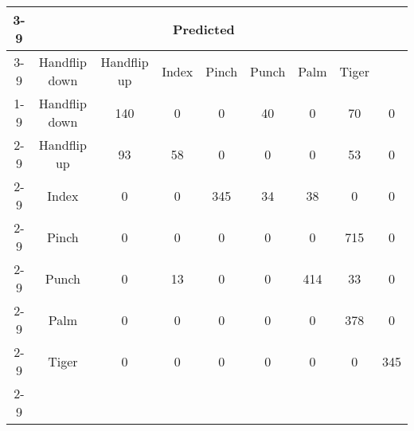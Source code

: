 \documentclass{standalone}
\begin{document}
 
 \begin{tabular}{|c |c |c |c |c |c |c |c |c |}
\cline{3-9}\multicolumn{2}{c|}{} & \multicolumn{7}{c|}{Predicted} \\ 
\cline{3-9} \multicolumn{2}{c |}{ } & Handflip down & Handflip up & Index & Pinch & Punch & Palm & Tiger\\ 
\cline{1-9}\multirow{7}{*}{\rotatebox[origin=c]{90}{Actual}} & Handflip down & 140 & 0 & 0 & 40 & 0 & 70 & 0\\ 
 \cline{2-9} & Handflip up & 93 & 58 & 0 & 0 & 0 & 53 & 0\\ 
 \cline{2-9} & Index & 0 & 0 & 345 & 34 & 38 & 0 & 0\\ 
 \cline{2-9} & Pinch & 0 & 0 & 0 & 0 & 0 & 715 & 0\\ 
 \cline{2-9} & Punch & 0 & 13 & 0 & 0 & 414 & 33 & 0\\ 
 \cline{2-9} & Palm & 0 & 0 & 0 & 0 & 0 & 378 & 0\\ 
 \cline{2-9} & Tiger & 0 & 0 & 0 & 0 & 0 & 0 & 345\\ 
 \cline{2-9}\hline \end{tabular}
 
\end{document}
